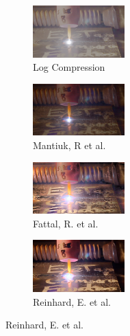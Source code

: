 \begin{figure}
\begin{subfigure}[b]{1.5in}
\centering
\includegraphics[width=1.4in]{ch2/diagrams/frames/5stops/log_5_stops.jpg}
\caption{Log Compression}
\label{fig:log_compress}
\end{subfigure}
\begin{subfigure}[b]{1.5in}
\centering
\includegraphics[width=1.4in]{ch2/diagrams/frames/5stops/untitled_pregamma_1_mantiuk06_contrast_mapping_0_1_saturation_factor_0_8_detail_factor_1.jpg}
\caption{Mantiuk, R et al.~\cite{mantiuk2006perceptual}}
\label{fig:mantiuk}
\end{subfigure}
\begin{subfigure}[b]{1.5in}
\centering
\includegraphics[width=1.4in]{ch2/diagrams/frames/5stops/untitled_pregamma_1_fattal_alpha_0_25_beta_0_57_saturation_0_38_noiseredux_0_fftsolver_1.jpg}
\caption{Fattal, R. et al.~\cite{fattal2002gradient}}
\label{fig:fattal}
\end{subfigure}
\begin{subfigure}[b]{1.5in}
\centering
\includegraphics[width=1.4in]{ch2/diagrams/frames/5stops/untitled_pregamma_1_reinhard02_key_0_07_phi_12_2_scales_range_4_lower1_upper90.jpg}
\caption{Reinhard, E. et al.~\cite{reinhard2002photographic}}
\label{fig:reinhard}
\end{subfigure}        


\end{figure}
